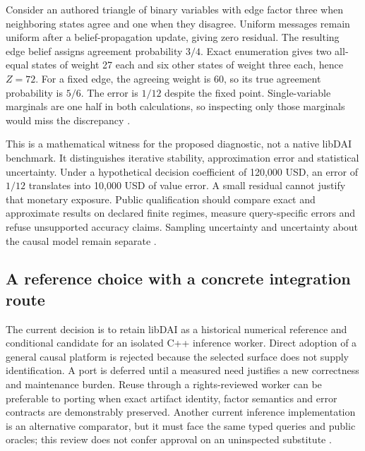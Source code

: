 Consider an authored triangle of binary variables with edge factor three
when neighboring states agree and one when they disagree. Uniform messages
remain uniform after a belief-propagation update, giving zero residual.
The resulting edge belief assigns agreement probability $3/4$. Exact
enumeration gives two all-equal states of weight 27 each and six other
states of weight three each, hence $Z=72$. For a fixed edge, the agreeing
weight is 60, so its true agreement probability is $5/6$. The error is
$1/12$ despite the fixed point. Single-variable marginals are one half in
both calculations, so inspecting only those marginals would miss the
discrepancy \citep{exec24_libdai_choice}.

This is a mathematical witness for the proposed diagnostic, not a native
libDAI benchmark. It distinguishes iterative stability, approximation error
and statistical uncertainty. Under a hypothetical decision coefficient of
120,000 USD, an error of $1/12$ translates into 10,000 USD of value error.
A small residual cannot justify that monetary exposure. Public qualification
should compare exact and approximate results on declared finite regimes,
measure query-specific errors and refuse unsupported accuracy claims.
Sampling uncertainty and uncertainty about the causal model remain separate
\citep{exec24_libdai_choice}.

\subsection{A reference choice with a concrete integration route}
The current decision is to retain libDAI as a historical numerical reference
and conditional candidate for an isolated C++ inference worker. Direct
adoption of a general causal platform is rejected because the selected
surface does not supply identification. A port is deferred until a measured
need justifies a new correctness and maintenance burden. Reuse through a
rights-reviewed worker can be preferable to porting when exact artifact
identity, factor semantics and error contracts are demonstrably preserved.
Another current inference implementation is an alternative comparator,
but it must face the same typed queries and public oracles; this review does
not confer approval on an uninspected substitute \citep{exec24_libdai_choice}.


